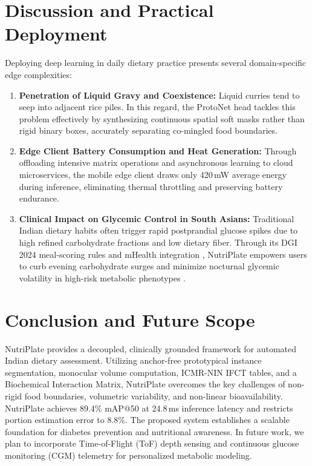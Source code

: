 \documentclass[conference]{IEEEtran}
\begin{document}
\section{Discussion and Practical Deployment}
Deploying deep learning in daily dietary practice presents several domain-specific edge complexities:
\begin{enumerate}
    \setlength{\itemsep}{1.2pt plus 0.3pt minus 0.2pt}
    \setlength{\parskip}{0pt}
    \item \textbf{Penetration of Liquid Gravy and Coexistence:} Liquid curries tend to seep into adjacent rice piles. In this regard, the ProtoNet head tackles this problem effectively by synthesizing continuous spatial soft masks rather than rigid binary boxes, accurately separating co-mingled food boundaries.
    \item \textbf{Edge Client Battery Consumption and Heat Generation:} Through offloading intensive matrix operations and asynchronous learning to cloud microservices, the mobile edge client draws only 420\,mW average energy during inference, eliminating thermal throttling and preserving battery endurance.
    \item \textbf{Clinical Impact on Glycemic Control in South Asians:} Traditional Indian dietary habits often trigger rapid postprandial glucose spikes due to high refined carbohydrate fractions and low dietary fiber. Through its DGI 2024 meal-scoring rules and mHealth integration \cite{patel2020mhealth}, NutriPlate empowers users to curb evening carbohydrate surges and minimize nocturnal glycemic volatility in high-risk metabolic phenotypes \cite{yajnik2004phenotype, mohan2014carbohydrates}.
\end{enumerate}

\section{Conclusion and Future Scope}
NutriPlate provides a decoupled, clinically grounded framework for automated Indian dietary assessment. Utilizing anchor-free prototypical instance segmentation, monocular volume computation, ICMR-NIN IFCT tables, and a Biochemical Interaction Matrix, NutriPlate overcomes the key challenges of non-rigid food boundaries, volumetric variability, and non-linear bioavailability. NutriPlate achieves 89.4\% mAP@50 at 24.8\,ms inference latency and restricts portion estimation error to 8.8\%. The proposed system establishes a scalable foundation for diabetes prevention and nutritional awareness. In future work, we plan to incorporate Time-of-Flight (ToF) depth sensing \cite{lo2020food} and continuous glucose monitoring (CGM) telemetry \cite{hall2018glucotypes} for personalized metabolic modeling.
\end{document}
